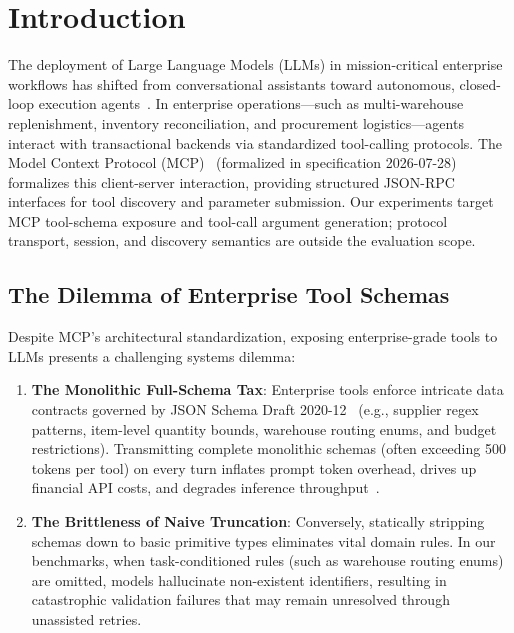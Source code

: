 \section{Introduction}
\label{sec:intro}

The deployment of Large Language Models (LLMs) in mission-critical enterprise workflows has shifted from conversational assistants toward autonomous, closed-loop execution agents~\cite{yao2022react,schick2024toolformer}. 
In enterprise operations—such as multi-warehouse replenishment, inventory reconciliation, and procurement logistics—agents interact with transactional backends via standardized tool-calling protocols.
The Model Context Protocol (MCP)~\cite{anthropic2024mcp} (formalized in specification 2026-07-28) formalizes this client-server interaction, providing structured JSON-RPC interfaces for tool discovery and parameter submission. Our experiments target MCP tool-schema exposure and tool-call argument generation; protocol transport, session, and discovery semantics are outside the evaluation scope.

\subsection{The Dilemma of Enterprise Tool Schemas}
Despite MCP's architectural standardization, exposing enterprise-grade tools to LLMs presents a challenging systems dilemma:
\begin{enumerate}
    \item \textbf{The Monolithic Full-Schema Tax}: Enterprise tools enforce intricate data contracts governed by JSON Schema Draft 2020-12~\cite{jsonschema202012} (e.g., supplier regex patterns, item-level quantity bounds, warehouse routing enums, and budget restrictions). Transmitting complete monolithic schemas (often exceeding 500 tokens per tool) on every turn inflates prompt token overhead, drives up financial API costs, and degrades inference throughput~\cite{patil2023gorilla}.
    \item \textbf{The Brittleness of Naive Truncation}: Conversely, statically stripping schemas down to basic primitive types eliminates vital domain rules. In our benchmarks, when task-conditioned rules (such as warehouse routing enums) are omitted, models hallucinate non-existent identifiers, resulting in catastrophic validation failures that may remain unresolved through unassisted retries.
\end{enumerate}

